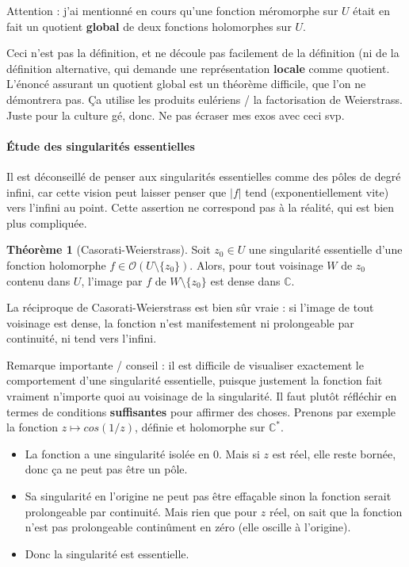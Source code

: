 \documentclass[11pt,a4paper]{article}
\newcommand{\C}{\mathbb{C}}
\theoremstyle{definition}
\newtheorem{theoreme}{Th\'eor\`eme}[section]
\theoremstyle{plain}
\begin{document}
Attention : j'ai mentionné en cours qu'une fonction méromorphe sur $U$ était en fait un quotient \textbf{global} de deux fonctions holomorphes sur $U$.

Ceci n'est pas la définition, et ne découle pas facilement de la définition (ni de la définition alternative, qui demande une représentation \textbf{locale} comme quotient. L'énoncé assurant un quotient global est un théorème difficile, que l'on ne démontrera pas. Ça utilise les produits eulériens / la factorisation de Weierstrass. Juste pour la culture gé, donc. Ne pas écraser mes exos avec ceci svp.



\paragraph{Étude des singularités essentielles}


\begin{attention}
Il est déconseillé de penser aux singularités essentielles comme des \og pôles de degré infini\fg, car cette vision  peut laisser penser que $|f|$ tend (exponentiellement vite) vers l'infini au point. Cette assertion ne correspond pas à la réalité, qui est bien plus compliquée.
\end{attention}

\begin{theoreme}[Casorati-Weierstrass]
Soit $z_0 \in U$ une singularité essentielle d'une fonction holomorphe $f \in \mathcal O(U\setminus \{z_0\})$.
Alors, pour tout voisinage $W$ de $z_0$ contenu dans $U$, l'image par $f$ de $W\setminus\{z_0\}$ est dense dans $\C$.
\end{theoreme}

\begin{remarque}
La réciproque de Casorati-Weierstrass est bien sûr vraie : si l'image de tout voisinage est dense, la fonction n'est manifestement ni prolongeable par continuité, ni tend vers l'infini.
\end{remarque}

Remarque importante / conseil : il est difficile de visualiser exactement le comportement d'une singularité essentielle, puisque justement la fonction fait vraiment n'importe quoi au voisinage de la singularité.
Il faut plutôt réfléchir en termes de conditions \textbf{suffisantes} pour affirmer des choses.
Prenons par exemple la fonction $z\mapsto cos(1/z)$, définie et holomorphe sur $\C^*$. 
\begin{itemize}
\item La fonction a une singularité isolée en $0$. Mais si $z$ est réel, elle reste bornée, donc ça ne peut pas être un pôle.
\item Sa singularité en l'origine ne peut pas être effaçable sinon la fonction serait prolongeable par continuité. Mais rien que pour $z$ réel, on sait que la fonction n'est pas prolongeable continûment en zéro (elle oscille à l'origine).
\item Donc la singularité est essentielle.
\end{itemize}
\end{document}
